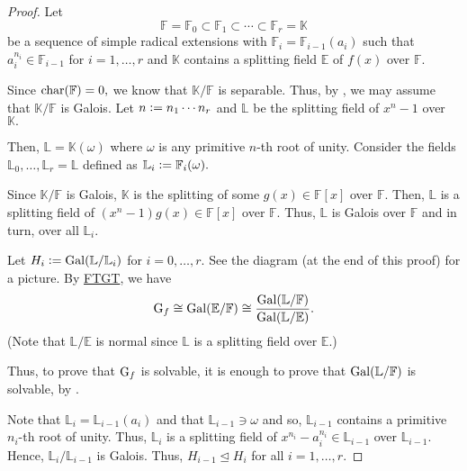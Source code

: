 \solvradicalimpliesgroup*\label{thm:solvradicalimpliesgroup2}
\begin{flushright}\hyperref[thm:solvradicalimpliesgroup]{\upsym}\end{flushright}
\begin{proof}
    Let
    \begin{equation*} 
        \mathbb{F} = \mathbb{F}_0 \subset \mathbb{F}_1 \subset \cdots \subset \mathbb{F}_r = \mathbb{K}
    \end{equation*}
    be a sequence of simple radical extensions with $\mathbb{F}_i = \mathbb{F}_{i - 1}(a_i)$ such that $a_i^{n_i} \in \mathbb{F}_{i - 1}$ for $i = 1, \ldots, r$ and $\mathbb{K}$ contains a splitting field $\mathbb{E}$ of $f(x)$ over $\mathbb{F}.$ 

    Since $\operatorname{char}(\mathbb{F}) = 0,$ we know that $\mathbb{K}/\mathbb{F}$ is separable. Thus, by , we may assume that $\mathbb{K}/\mathbb{F}$ is Galois. Let $n \vcentcolon= n_1 \cdots n_r$ and $\mathbb{L}$ be the splitting field of $x^n - 1$ over $\mathbb{K}.$

    Then, $\mathbb{L} = \mathbb{K}(\omega)$ where $\omega$ is any primitive $n$-th root of unity. Consider the fields $\mathbb{L}_0, \ldots, \mathbb{L}_r = \mathbb{L}$ defined as $\mathbb{L}_i \vcentcolon= \mathbb{F}_i(\omega).$ 

    Since $\mathbb{K}/\mathbb{F}$ is Galois, $\mathbb{K}$ is the splitting of some $g(x) \in \mathbb{F}[x]$ over $\mathbb{F}.$ Then, $\mathbb{L}$ is a splitting field of $(x^n - 1)g(x) \in \mathbb{F}[x]$ over $\mathbb{F}.$ Thus, $\mathbb{L}$ is Galois over $\mathbb{F}$ and in turn, over all $\mathbb{L}_i.$

    Let $H_i \vcentcolon= \operatorname{Gal}(\mathbb{L}/\mathbb{L}_i)$ for $i = 0, \ldots, r.$ See the diagram (at the end of this proof) for a picture. By \hyperref[thm:FTGT]{FTGT}, we have 
    \begin{equation*} 
        \operatorname{G}_f \cong \operatorname{Gal}(\mathbb{E}/\mathbb{F}) \cong \frac{\operatorname{Gal}(\mathbb{L}/\mathbb{F})}{\operatorname{Gal}(\mathbb{L}/\mathbb{E})}.
    \end{equation*}
    (Note that $\mathbb{L}/\mathbb{E}$ is normal since $\mathbb{L}$ is a splitting field over $\mathbb{E}.$)

    Thus, to prove that $\operatorname{G}_f$ is solvable, it is enough to prove that $\operatorname{Gal}(\mathbb{L}/\mathbb{F})$ is solvable, by . 

    Note that $\mathbb{L}_i = \mathbb{L}_{i - 1}(a_i)$ and that $\mathbb{L}_{i - 1} \ni \omega$ and so, $\mathbb{L}_{i - 1}$ contains a primitive $n_i$-th root of unity. Thus, $\mathbb{L}_i$ is a splitting field of $x^{n_i} - a_i^{n_i} \in \mathbb{L}_{i - 1}$ over $\mathbb{L}_{i - 1}.$ Hence, $\mathbb{L}_i/\mathbb{L}_{i - 1}$ is Galois. Thus, $H_{i - 1} \unlhd H_i$ for all $i = 1, \ldots, r.$


\end{proof}
